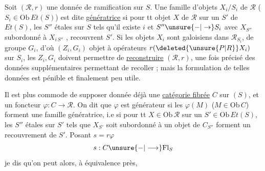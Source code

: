 Soit $(\mathscr R,r)$ une donnée de ramification sur $S$. Une famille d'objets $X_i/S_i$ de $\mathscr R$ ($S_i\in\mathrm{Ob}\,Et(S)$) est dite \uline{génératrice} si pour tt objet $X$ de $\mathscr R$ sur un $S'$ de $Et(S)$, les $S''$ étales sur $S$ tels qu'il existe $i$ et $S''\unsure{-|\to}S_i$ avec $X_{S''}$ subordonné à $X_{i\,S''}$ , recouvrent $S'$.
Si  les objets $X_i$ sont galoisiens dans $\mathscr R_{S_i}$,  de groupe $G_i$, d'où $(Z_i,G_i)$ objet à opérateurs $r(\deleted{\unsure{P|R}}X_i)$ sur $S_i$, les $Z_i,G_i$ doivent permettre de \uline{reconstruire} $(\mathscr R,r)$, une fois précisé des données supplémentaires permettant de recoller ; mais la formulation de telles données est pénible et finalement peu utile.

Il est plus commode de supposer donnée déjà une \uline{catégorie fibrée} $C$ sur $(S)$, et un foncteur  $\varphi:C\longrightarrow\mathscr R$. On dit que $\varphi$ est générateur si les $\varphi(M)$ ($M\in\mathrm{Ob}\,C$) forment une famille génératrice, i.e si pour tt $X\in\mathrm{Ob}\,\mathscr R$ sur un $S'\in\mathrm{Ob}\,Et(S)$, les $S''$ étales sur $S'$ tels que $X_{S'}$ soit subordonné à un objet  de $C_{S''}$  forment un recouvrement de $S'$. Posant $s=r\varphi$
\[
s:C\unsure{-|\longrightarrow}\mathrm{Fl}_S
\]
je dis qu'on peut alors, à équivalence près,
